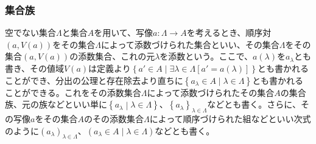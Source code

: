 \documentclass[dvipdfmx]{jsarticle}
\begin{document}
\subsubsection{集合族}
\begin{dfn}
空でない集合$\varLambda$と集合$A$を用いて、写像$a:\varLambda \rightarrow A$を考えるとき、順序対$\left( a,V(a) \right)$をその集合$\varLambda$によって添数づけられた集合といい、その集合$\varLambda$をその集合$\left( a,V(a) \right)$の添数集合、これの元$\lambda$を添数という。ここで、$a(\lambda)$を$a_{\lambda}$とも書き、その値域$V(a)$は定義より$\left\{ a' \in A \middle| \exists\lambda \in \varLambda\left[ a' = a(\lambda) \right] \right\}$とも書かれることができ、分出の公理と存在除去より直ちに$\left\{ a_{\lambda} \in A \middle| \lambda \in \varLambda \right\}$とも書かれることができる。これをその添数集合$\varLambda$によって添数づけられたその集合$A$の集合族、元の族などといい単に$\left\{ a_{\lambda} \middle| \lambda \in \varLambda \right\}$、$\left\{ a_{\lambda} \right\}_{\lambda \in \varLambda}$などとも書く。さらに、その写像$a$をその集合$A$のその添数集合$\varLambda$によって順序づけられた組などといい次式のように$\left( a_{\lambda} \right)_{\lambda \in \varLambda}$、$\left( a_{\lambda} \in A \middle| \lambda \in \varLambda \right)$などとも書く。
\begin{center}
\end{center}
\end{dfn}
\end{document}
